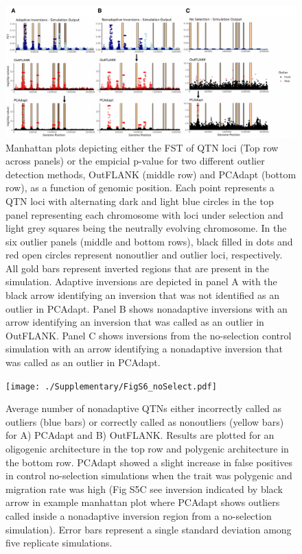 \documentclass[10pt, scrartlc]{article}
\begin{document}
\begin{figure}[h]
	\begin{center}
		\includegraphics[width = 6.5 in]{FigS5_manh_outliers.pdf}
	\end{center}
	\caption[Incorrect Outlier Examples]{Manhattan plots depicting either the FST of QTN loci (Top row across panels) or the empicial p-value for two different outlier detection methods, OutFLANK (middle row) and PCAdapt (bottom row), as a function of genomic position. Each point represents a QTN loci with alternating dark and light blue circles in the top panel representing each chromosome with loci under selection and light grey squares being the neutrally evolving chromosome. In the six outlier panels (middle and bottom rows), black filled in dots and red open circles represent nonoutlier and outlier loci, respectively. All gold bars represent inverted regions that are present in the simulation. Adaptive inversions are depicted in panel A with the black arrow identifying an inversion that was not identified as an outlier in PCAdapt. Panel B shows nonadaptive inversions with an arrow identifying an inversion that was called as an outlier in OutFLANK. Panel C shows inversions from the no-selection control simulation with an arrow identifying a nonadaptive inversion that was called as an outlier in PCAdapt.}
\end{figure}

\clearpage
\newpage

\begin{figure}[h]
	\begin{center}
		\texttt{[image: ./Supplementary/FigS6\_noSelect.pdf]}
	\end{center}
	\caption[Genome Scan Performance for No-Selection Simulations]{Average number of nonadaptive QTNs either incorrectly called as outliers (blue bars) or correctly called as nonoutliers (yellow bars) for A) PCAdapt and B) OutFLANK. Results are plotted for an oligogenic architecture in the top row and polygenic architecture in the bottom row. PCAdapt showed a slight increase in false positives in control no-selection simulations when the trait was polygenic and migration rate was high (Fig S5C see inversion indicated by black arrow in example manhattan plot where PCAdapt shows outliers called inside a nonadaptive inversion region from a no-selection simulation). Error bars represent a single standard deviation among five replicate simulations.}
\end{figure}

\clearpage
\newpage
\end{document}
